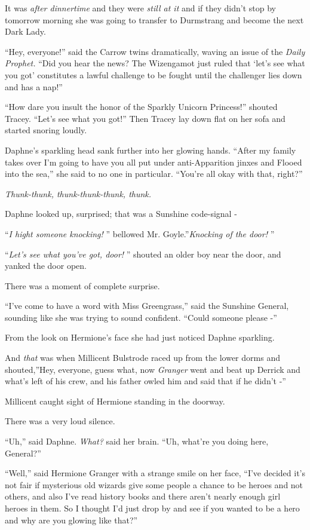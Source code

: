 It was \emph{after dinnertime} and they were \emph{still at it} and if
they didn't stop by tomorrow morning she was going to transfer to
Durmstrang and become the next Dark Lady.

``Hey, everyone!'' said the Carrow twins dramatically, waving an issue
of the \emph{Daily Prophet.} ``Did you hear the news? The Wizengamot
just ruled that `let's see what you got' constitutes a lawful challenge
to be fought until the challenger lies down and has a nap!''

``How dare you insult the honor of the Sparkly Unicorn Princess!''
shouted Tracey. ``Let's see what you got!'' Then Tracey lay down flat on
her sofa and started snoring loudly.

Daphne's sparkling head sank further into her glowing hands. ``After my
family takes over I'm going to have you all put under anti-Apparition
jinxes and Flooed into the sea,'' she said to no one in particular.
``You're all okay with that, right?''

\emph{Thunk-thunk, thunk-thunk-thunk, thunk.}

Daphne looked up, surprised; that was a Sunshine code-signal -

``\emph{I hight someone knocking!} '' bellowed Mr. Goyle.''\emph{Knocking
of the door!} ''

``\emph{Let's see what you've got, door!} '' shouted an older boy near the
door, and yanked the door open.

There was a moment of complete surprise.

``I've come to have a word with Miss Greengrass,'' said the Sunshine
General, sounding like she was trying to sound confident. ``Could
someone please -''

From the look on Hermione's face she had just noticed Daphne sparkling.

And \emph{that} was when Millicent Bulstrode raced up from the lower
dorms and shouted,''Hey, everyone, guess what, now \emph{Granger} went
and beat up Derrick and what's left of his crew, and his father owled
him and said that if he didn't -''

Millicent caught sight of Hermione standing in the doorway.

There was a very loud silence.

``Uh,'' said Daphne. \emph{What?} said her brain. ``Uh, what're you
doing here, General?''

``Well,'' said Hermione Granger with a strange smile on her face, ``I've
decided it's not fair if mysterious old wizards give some people a
chance to be heroes and not others, and also I've read history books and
there aren't nearly enough girl heroes in them. So I thought I'd just
drop by and see if you wanted to be a hero and why are you glowing like
that?''

